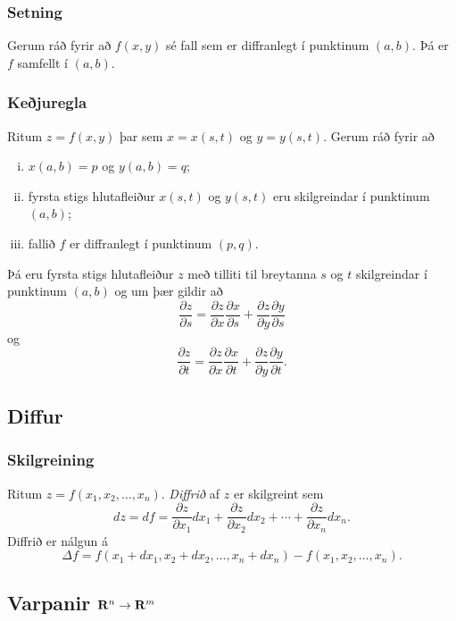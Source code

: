 \subsubsection{Setning }
  Gerum ráð fyrir að $f(x,y)$ sé fall sem er
diffranlegt í punktinum $(a,b)$.  Þá er $f$ samfellt í $(a,b)$.




\subsubsection{Keðjuregla }
 Ritum $z=f(x,y)$ þar sem $x=x(s,t)$ og
$y=y(s,t)$.  Gerum ráð fyrir að 

\begin{enumerate}[(i)]
\item $x(a,b)=p$ og $y(a,b)=q$;
\item fyrsta stigs hlutafleiður $x(s,t)$ og $y(s,t)$ eru skilgreindar í
punktinum $(a,b)$;
\item fallið $f$ er diffranlegt í punktinum $(p,q)$.
\end{enumerate}

Þá eru fyrsta stigs hlutafleiður $z$ með tilliti til breytanna $s$ og
$t$ skilgreindar í punktinum $(a,b)$ og um þær gildir að 
$$\frac{\partial z}{\partial s}=
\frac{\partial z}{\partial x}\frac{\partial x}{\partial s}
+\frac{\partial z}{\partial y}\frac{\partial y}{\partial s}$$
og
$$\frac{\partial z}{\partial t}=
\frac{\partial z}{\partial x}\frac{\partial x}{\partial t}
+\frac{\partial z}{\partial y}\frac{\partial y}{\partial t}.$$




\subsection{Diffur} 

\subsubsection{Skilgreining }
  Ritum $z=f(x_1, x_2, \ldots, x_n)$.  {\em
  Diffrið} af $z$ er skilgreint sem 
$$dz=df=\frac{\partial z}{\partial x_1}dx_1
+\frac{\partial z}{\partial x_2}dx_2
+\cdots+\frac{\partial z}{\partial x_n}dx_n.$$
Diffrið er nálgun á 
$$\Delta f=f(x_1+dx_1, x_2+dx_2,\ldots,
x_n+dx_n)-f(x_1,x_2,\ldots,x_n).$$




\subsection{Varpanir $\mbox{${\bf R}^n$}\rightarrow\mbox{${\bf R}^m$}$} 
